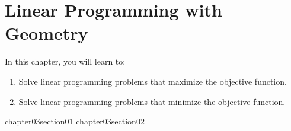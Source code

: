 \chapter{Linear Programming with Geometry}

In this chapter, you will learn to:

\begin{enumerate}
    \item Solve linear programming problems that maximize the objective function.
    \item Solve linear programming problems that minimize the objective function.
\end{enumerate}


{chapter03section01}
{chapter03section02}